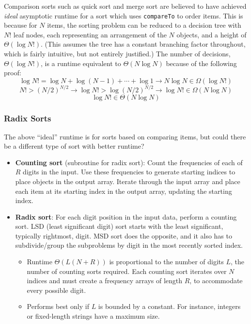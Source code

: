 \documentclass{article}
\begin{document}
Comparison sorts such as quick sort and merge sort are believed to have achieved \textit{ideal} asymptotic runtime for a sort which uses \texttt{compareTo} to order items. This is because for $N$ items, the sorting problem can be reduced to a decision tree with $N!$ leaf nodes, each representing an arrangement of the $N$ objects, and a height of $\Theta(\log N!)$. (This assumes the tree has a constant branching factor throughout, which is fairly intuitive, but not entirely justified.) The number of decisions, $\Theta(\log N!)$, is a runtime equivalent to $\Theta(N \log N)$ because of the following proof:
$$\log N! = \log N + \log (N - 1) + \cdots + \log 1 \longrightarrow N\log N \in \Omega(\log N!)$$
\vspace{-6mm}
$$N! > (N/2)^{N/2} \longrightarrow \log N! > \log (N/2)^{N/2} \longrightarrow \log N! \in \Omega(N\log N)$$
$$\log N! \in \Theta(N \log N)$$

\subsubsection*{Radix Sorts}

The above ``ideal'' runtime is for sorts based on comparing items, but could there be a different type of sort with better runtime?

\begin{itemize}
    \item \textbf{Counting sort} (subroutine for radix sort): Count the frequencies of each of $R$ digits in the input. Use these frequencies to generate starting indices to place objects in the output array. Iterate through the input array and place each item at its starting index in the output array, updating the starting index.
    \item \textbf{Radix sort}: For each digit position in the input data, perform a counting sort. LSD (least significant digit) sort starts with the least significant, typically rightmost, digit. MSD sort does the opposite, and it also has to subdivide/group the subproblems by digit in the most recently sorted index.
    \begin{itemize}
        \item Runtime $\Theta(L(N + R))$ is proportional to the number of digits $L$, the number of counting sorts required. Each counting sort iterates over $N$ indices and must create a frequency arrays of length $R$, to accommodate every possible digit.
        \item Performs best only if $L$ is bounded by a constant. For instance, integers or fixed-length strings have a maximum size.
    \end{itemize}
\end{itemize}
\end{document}
